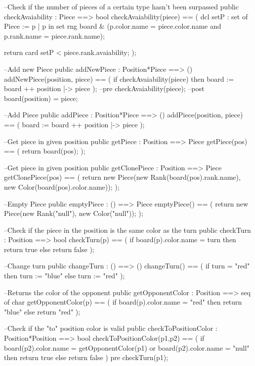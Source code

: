 \begin{vdm_al}
  --Check if the number of pieces of a certain type hasn't been surpassed
  public checkAvaiability : Piece ==> bool
   checkAvaiability(piece) ==
   (
    dcl setP : set of Piece := {p | p in set rng board & 
         (p.color.name = piece.color.name and p.rank.name = piece.rank.name)};
         
    return card setP < piece.rank.avaiability;
   );
  
  --Add new Piece
  public addNewPiece : Position*Piece ==> ()
   addNewPiece(position, piece) ==
   (
    if checkAvaiability(piece)
     then board := board ++ {position |-> piece}
   );
   --pre checkAvaiability(piece);
   --post board(position) = piece;
  
  --Add Piece
  public addPiece : Position*Piece ==> ()
   addPiece(position, piece) ==
   (
    board := board ++ {position |-> piece}
   );
  
  --Get piece in given position
  public getPiece : Position ==> Piece
   getPiece(pos) ==
   (
    return board(pos);
   );
   
  --Get piece in given position
  public getClonePiece : Position ==> Piece
   getClonePiece(pos) ==
   (
    return new Piece(new Rank(board(pos).rank.name), new Color(board(pos).color.name));
   );
  
  --Empty Piece
   public emptyPiece : () ==> Piece
    emptyPiece() ==
    (
     return new Piece(new Rank("null"), new Color("null"));
    );
  
  --Check if the piece in the position is the same color as the turn 
  public checkTurn : Position ==> bool
   checkTurn(p) ==
    (
     if board(p).color.name = turn
      then return true
     else return false
    );
    
  --Change turn 
  public changeTurn : () ==> ()
   changeTurn() ==
    (
     if turn = "red"
      then turn := "blue"
     else turn := "red"
    );
   
  --Returns the color of the opponent
  public getOpponentColor : Position ==> seq of char
   getOpponentColor(p) ==
    (
     if board(p).color.name = "red"
      then return "blue"
     else return "red"
    );
    
  --Check if the "to" position color is valid
  public checkToPositionColor : Position*Position ==> bool
   checkToPositionColor(p1,p2) ==
    (
     if board(p2).color.name = getOpponentColor(p1) or
       board(p2).color.name = "null"
      then return true
     else return false
    )
    pre checkTurn(p1);
    

\end{vdm_al}
